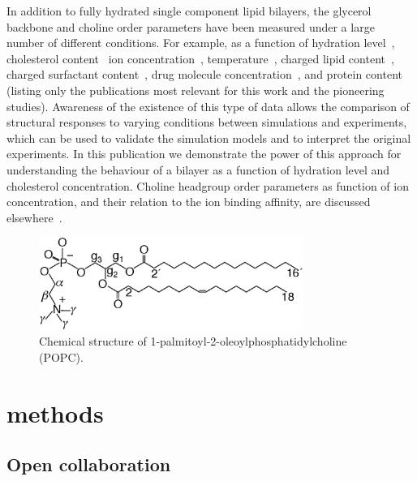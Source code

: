 \documentclass[journal=jacsat,manuscript=article]{achemso}
\begin{document}
In addition to fully hydrated single component lipid bilayers, the glycerol backbone and choline order parameters
have been measured under a large number of different conditions. For example, as a function of hydration level~\cite{bechinger91,ulrich94,dvinskikh05b}, cholesterol content~\cite{brown78,ferreira13}
ion concentration~\cite{brown77,akutsu81,altenbach84,roux90,roux91}, temperature~\cite{gally75}, charged lipid content~\cite{roux90,roux91}, charged surfactant content~\cite{scherer89}, 
drug molecule concentration~\cite{browning82,kelusky84,castro08}, and protein content~\cite{roux89,kuchinka89} (listing only the publications most relevant for this work and the pioneering studies).
Awareness of the existence of this type of data allows the comparison of structural responses to varying conditions between simulations and experiments,
which can be used to validate the simulation models and to interpret the original experiments. 
In this publication we demonstrate the power of this approach for understanding the behaviour of a bilayer as a function of hydration level and cholesterol concentration.
Choline headgroup order parameters as function of ion concentration, and their relation to the ion binding affinity, are discussed elsewhere~\cite{ionpaper}.

  \begin{figure}[]
  \centering
  \includegraphics[width=8.6cm]{POPCstructure.eps}

  \caption{\label{POPCstructure}
    Chemical structure of  1-palmitoyl-2-oleoylphosphatidylcholine (POPC).}
  
\end{figure}

\section{methods}

\subsection{Open collaboration}
\end{document}
